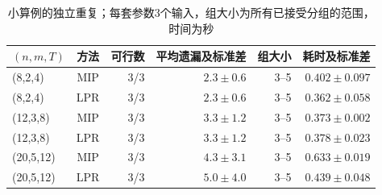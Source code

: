 \begin{table}[htbp]
\centering\footnotesize
\caption{小算例的独立重复；每套参数3个输入，组大小为所有已接受分组的范围，时间为秒}\label{tab:scenario-checks}
\begin{tabular}{lcrrrr}\toprule
$(n,m,T)$ & 方法 & 可行数 & 平均遗漏及标准差 & 组大小 & 耗时及标准差 \\\midrule
(8,2,4) & MIP & 3/3 & $2.3\pm0.6$ & 3--5 & $0.402\pm0.097$ \\
(8,2,4) & LPR & 3/3 & $2.3\pm0.6$ & 3--5 & $0.362\pm0.058$ \\
(12,3,8) & MIP & 3/3 & $3.3\pm1.2$ & 3--5 & $0.373\pm0.002$ \\
(12,3,8) & LPR & 3/3 & $3.3\pm1.2$ & 3--5 & $0.378\pm0.023$ \\
(20,5,12) & MIP & 3/3 & $4.3\pm3.1$ & 3--5 & $0.633\pm0.019$ \\
(20,5,12) & LPR & 3/3 & $5.0\pm4.0$ & 3--5 & $0.439\pm0.048$ \\
\bottomrule\end{tabular}
\end{table}
